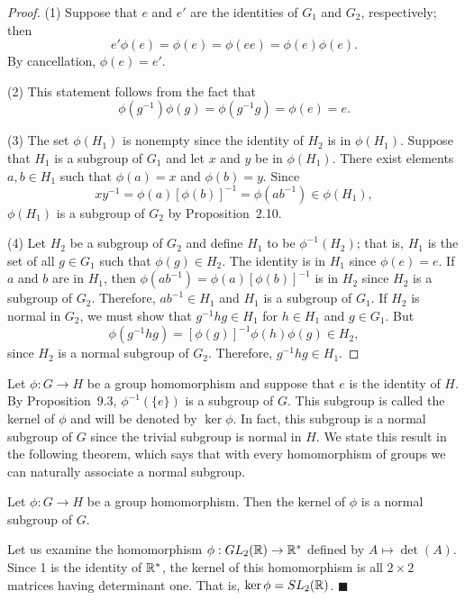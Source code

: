  
\begin{proof}
(1)
Suppose that $e$ and $e'$ are the identities of $G_1$ and $G_2$,
respectively; then
$$
e' \phi(e) = \phi(e) = \phi(e e) = \phi(e) \phi(e).
$$
By cancellation, $\phi(e) = e'$.
 
 
(2)
This statement follows from the fact that
$$
\phi( g^{-1}) \phi(g) = \phi(g^{-1} g) = \phi(e) = e.
$$
 
 
(3)
The set $\phi(H_1)$ is nonempty since the identity of $H_2$ is in
$\phi(H_1)$.
Suppose that $H_1$ is a subgroup of $G_1$ and let $x$ and $y$ be in
$\phi(H_1)$. There exist elements $a, b \in H_1$ such that $\phi(a) =
x$ and $\phi(b)=y$. Since 
$$
xy^{-1} = \phi(a)[ \phi(b)]^{-1} = \phi(a b^{-1} ) \in \phi(H_1),
$$
$\phi(H_1)$ is a subgroup of $G_2$ by Proposition~2.10.
 
 
(4)
Let $H_2$ be a subgroup of $G_2$ and define $H_1$ to be
$\phi^{-1}(H_2)$; that is, $H_1$ is the set of all $g \in G_1$ such
that $\phi(g) \in H_2$.  The identity is in $H_1$ since $\phi(e) = e$.
If $a$ and $b$ are in $H_1$, then $\phi(ab^{-1}) = \phi(a)[ \phi(b)
]^{-1}$ is in $H_2$ since $H_2$ is a subgroup of $G_2$.  Therefore,
$ab^{-1} \in H_1$ and $H_1$ is a subgroup of $G_1$. If $H_2$ is normal
in $G_2$, we must show that $g^{-1} h g \in H_1$ for $h \in H_1$ and
$g \in G_1$. But 
$$
\phi( g^{-1} h g) = [ \phi(g) ]^{-1} \phi( h ) \phi( g ) \in
H_2,
$$
since $H_2$ is a normal subgroup of $G_2$.  Therefore, $g^{-1}hg \in
H_1$.
\end{proof}
 
 
\medskip
 
 
Let $\phi : G \rightarrow H$ be a group homomorphism and suppose that
$e$ is the identity of $H$. By Proposition~9.3, $\phi^{-1} ( \{ e \}
)$ is a subgroup of $G$. This subgroup is called the {\bfi
kernel\/} of $\phi$ and will
be denoted by $\ker \phi$\label{kernelofphi}.  In fact, this subgroup
is a normal subgroup of $G$ since the trivial subgroup is normal in
$H$.  We state this result in the following theorem, which says that
with every homomorphism of groups we can naturally associate a normal
subgroup.   
 
 
\begin{theorem}
Let $\phi : G \rightarrow H$ be a group homomorphism. Then the kernel
of $\phi$ is a normal subgroup of $G$. 
\end{theorem}
 
 
Let us examine the homomorphism $\phi : GL_2( {\Bbb R }) \rightarrow
{\Bbb R}^\ast$ defined by $A \mapsto \det( A )$. Since 1 is the
identity of ${\Bbb R}^\ast$, the kernel of this homomorphism is all
$2 \times 2$ matrices having determinant one. That is, $\ker \phi =
SL_2( {\Bbb R })$.
\mbox{\hspace{1in}}
\hspace{\fill} $\blacksquare$
 
